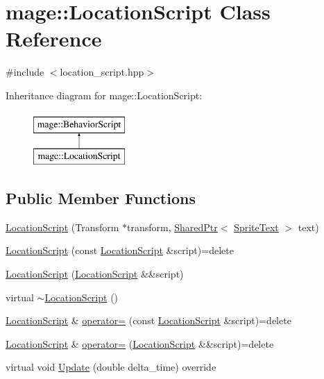 \hypertarget{classmage_1_1_location_script}{}\section{mage\+:\+:Location\+Script Class Reference}
\label{classmage_1_1_location_script}


{\ttfamily \#include $<$location\+\_\+script.\+hpp$>$}

Inheritance diagram for mage\+:\+:Location\+Script\+:\begin{figure}[H]
\begin{center}
\leavevmode
\includegraphics[height=2.000000cm]{classmage_1_1_location_script}
\end{center}
\end{figure}
\subsection*{Public Member Functions}
\begin{DoxyCompactItemize}
\item 
\hyperlink{classmage_1_1_location_script_a6ba4b1c4a698ab5ea0d7deb7ffa58bed}{Location\+Script} (Transform $\ast$transform, \hyperlink{namespacemage_a1e01ae66713838a7a67d30e44c67703e}{Shared\+Ptr}$<$ \hyperlink{classmage_1_1_sprite_text}{Sprite\+Text} $>$ text)
\item 
\hyperlink{classmage_1_1_location_script_a53fb0562896eadb4c747d53b53f65b40}{Location\+Script} (const \hyperlink{classmage_1_1_location_script}{Location\+Script} \&script)=delete
\item 
\hyperlink{classmage_1_1_location_script_a6cddb54a11e5d5d6dee034ef04ffbf2f}{Location\+Script} (\hyperlink{classmage_1_1_location_script}{Location\+Script} \&\&script)
\item 
virtual \hyperlink{classmage_1_1_location_script_a95ed60a4bd7d228cc28ce1622f254d75}{$\sim$\+Location\+Script} ()
\item 
\hyperlink{classmage_1_1_location_script}{Location\+Script} \& \hyperlink{classmage_1_1_location_script_a49409b091dbd1b93830c46831be453fb}{operator=} (const \hyperlink{classmage_1_1_location_script}{Location\+Script} \&script)=delete
\item 
\hyperlink{classmage_1_1_location_script}{Location\+Script} \& \hyperlink{classmage_1_1_location_script_a6e2ad5cd12a984d38c66bbcc81fef94b}{operator=} (\hyperlink{classmage_1_1_location_script}{Location\+Script} \&\&script)=delete
\item 
virtual void \hyperlink{classmage_1_1_location_script_a3ffe0474c573e2cf858aee62056324a3}{Update} (double delta\+\_\+time) override
\end{DoxyCompactItemize}
